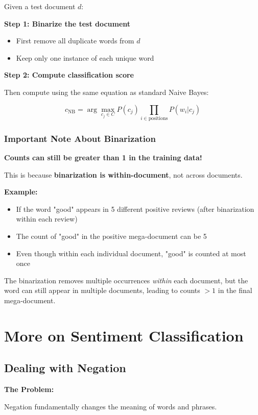\documentclass[11pt,a4paper]{article}
\theoremstyle{definition}
\theoremstyle{plain}
\theoremstyle{remark}
\begin{document}
Given a test document $d$:

\textbf{Step 1: Binarize the test document}
\begin{itemize}
    \item First remove all duplicate words from $d$
    \item Keep only one instance of each unique word
\end{itemize}

\textbf{Step 2: Compute classification score}

Then compute using the same equation as standard Naive Bayes:

\[
c_{\text{NB}} = \arg\max_{c_j \in C} P(c_j) \prod_{i \in \text{positions}} P(w_i | c_j)
\]

\subsubsection{Important Note About Binarization}

\textbf{Counts can still be greater than 1 in the training data!}

This is because \textbf{binarization is within-document}, not across documents.

\textbf{Example:}
\begin{itemize}
    \item If the word "good" appears in 5 different positive reviews (after binarization within each review)
    \item The count of "good" in the positive mega-document can be 5
    \item Even though within each individual document, "good" is counted at most once
\end{itemize}

The binarization removes multiple occurrences \textit{within} each document, but the word can still appear in multiple documents, leading to counts $> 1$ in the final mega-document.

\section{More on Sentiment Classification}

\subsection{Dealing with Negation}

\textbf{The Problem:}

Negation fundamentally changes the meaning of words and phrases.
\end{document}
